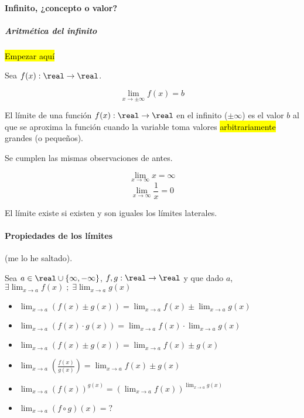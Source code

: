 \paragraph{Infinito, ¿concepto o valor?}
\subparagraph{Aritmética del infinito}

\hl{Empezar aquí}

\begin{defn}
Sea $f(x):\real\to\real$.

\[\lim_{x\to \pm\infty} f(x) = b\]

El límite de una función $f(x):\real\to\real$ en el infinito ($\pm\infty$) es el valor $b$ al que se aproxima la función cuando la variable toma valores \hl{arbitrariamente} grandes (o pequeños).
\end{defn}

\obs Se cumplen las mismas observaciones de antes.

\begin{example}
	\[\lim_{x\to\infty}x=\infty\]
	\[\lim_{x\to\infty}\frac{1}{x}=0\]
\end{example}

\begin{defn} 
	El límite existe si existen y son iguales los límites laterales. 
\end{defn}


\paragraph{Propiedades de los límites} (me lo he saltado).

Sea $a\in\real\cup\{\infty,-\infty\}$, $f,g:\real\to\real$ y que dado $a$, $\exists\lim_{x\to a}f(x) \;;\; \exists\lim_{x\to a}g(x)$
\begin{itemize}
	\item $\lim_{x\to a} \left(f(x) \pm g(x)\right) = \lim_{x\to a} f(x) \pm \lim_{x\to a} g(x)$
	\item $\lim_{x\to a} \left(f(x) · g(x)\right) = \lim_{x\to a} f(x) · \lim_{x\to a} g(x)$
	\item $\lim_{x\to a} \left(f(x) \pm g(x)\right) = \lim_{x\to a} f(x) \pm g(x)$
	\item $\lim_{x\to a} \left(\frac{f(x)}{g(x)}\right) = \lim_{x\to a} f(x) \pm g(x)$
	\item $\lim_{x\to a} \left(f(x)\right)^{g(x)} = \left(\lim_{x\to a} f(x)\right)^{\lim_{x\to a} g(x)}$	
	\item $\lim_{x\to a} (f\circ g)(x) = ?$	
\end{itemize}

